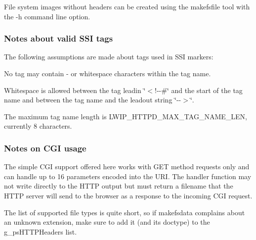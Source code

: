 File system images without headers can be created using the makefsfile tool with the -\/h command line option.

\subsubsection*{Notes about valid S\+SI tags }

The following assumptions are made about tags used in S\+SI markers\+:


\begin{DoxyEnumerate}
\item No tag may contain \textquotesingle{}-\/\textquotesingle{} or whitespace characters within the tag name.
\item Whitespace is allowed between the tag leadin \char`\"{}$<$!-\/-\/\#\char`\"{} and the start of the tag name and between the tag name and the leadout string \char`\"{}-\/-\/$>$\char`\"{}.
\item The maximum tag name length is L\+W\+I\+P\+\_\+\+H\+T\+T\+P\+D\+\_\+\+M\+A\+X\+\_\+\+T\+A\+G\+\_\+\+N\+A\+M\+E\+\_\+\+L\+EN, currently 8 characters.
\end{DoxyEnumerate}

\subsubsection*{Notes on C\+GI usage }

The simple C\+GI support offered here works with G\+ET method requests only and can handle up to 16 parameters encoded into the U\+RI. The handler function may not write directly to the H\+T\+TP output but must return a filename that the H\+T\+TP server will send to the browser as a response to the incoming C\+GI request.

The list of supported file types is quite short, so if makefsdata complains about an unknown extension, make sure to add it (and its doctype) to the \textquotesingle{}g\+\_\+ps\+H\+T\+T\+P\+Headers\textquotesingle{} list. 